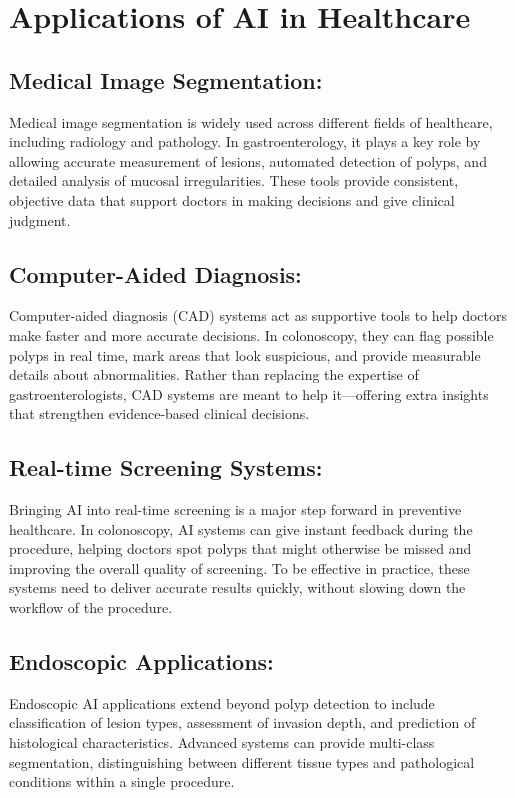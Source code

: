 \documentclass[a4paper,12pt]{report}
\begin{document}
    \section{Applications of AI in Healthcare}
  
    \subsection{Medical Image Segmentation:}
        Medical image segmentation is widely used across different fields of healthcare, including radiology and pathology. In gastroenterology, it plays a key role by allowing accurate measurement of lesions, automated detection of polyps, and detailed analysis of mucosal irregularities. These tools provide consistent, objective data that support doctors in making decisions and give clinical judgment. 
    \subsection{Computer-Aided Diagnosis:}
   Computer-aided diagnosis (CAD) systems act as supportive tools to help doctors make faster and more accurate decisions. In colonoscopy, they can flag possible polyps in real time, mark areas that look suspicious, and provide measurable details about abnormalities. Rather than replacing the expertise of gastroenterologists, CAD systems are meant to help it—offering extra insights that strengthen evidence-based clinical decisions.
    \subsection{Real-time Screening Systems:}
Bringing AI into real-time screening is a major step forward in preventive healthcare. In colonoscopy, AI systems can give instant feedback during the procedure, helping doctors spot polyps that might otherwise be missed and improving the overall quality of screening. To be effective in practice, these systems need to deliver accurate results quickly, without slowing down the workflow of the procedure. 
    \subsection{Endoscopic Applications:}
   Endoscopic AI applications extend beyond polyp detection to include classification of lesion types, assessment of invasion depth, and prediction of histological characteristics. Advanced systems can provide multi-class segmentation, distinguishing between different tissue types and pathological conditions within a single procedure.
\end{document}
